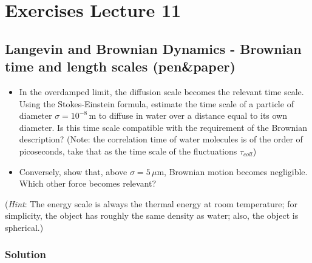 \documentclass[../main.tex]{subfiles}
\begin{document}
\chapter{Exercises Lecture 11}

\section{Langevin and Brownian Dynamics - Brownian time and length scales (pen\&paper)}

\begin{itemize}
    \item In the overdamped limit, the diffusion scale becomes the relevant time scale. Using the Stokes-Einstein formula, estimate the time scale of a particle of diameter $\sigma = 10^{-8} \, \text{m}$ to diffuse in water over a distance equal to its own diameter. Is this time scale compatible with the requirement of the Brownian description? (Note: the correlation time of water molecules is of the order of picoseconds, take that as the time scale of the fluctuations $\tau_{coll}$)

    \item Conversely, show that, above $\sigma = 5 \, \mu\text{m}$, Brownian motion becomes negligible. Which other force becomes relevant?
\end{itemize}
    (\textit{Hint}: The energy scale is always the thermal energy at room temperature; for simplicity, the object has roughly the same density as water; also, the object is spherical.)

\subsection*{Solution}
\end{document}
